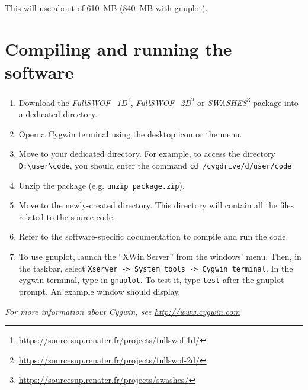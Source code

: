 \documentclass[a4paper, 11pt]{article}
\newcommand{\FullSWOFoneD}{\emph{FullSWOF\_1D}}
\newcommand{\FullSWOFtwoD}{\emph{FullSWOF\_2D}}
\newcommand{\SWASHES}{\emph{SWASHES}}
\newcommand{\MainWebSiteFSoneD}{https://sourcesup.renater.fr/projects/fullswof-1d/}
\newcommand{\MainWebSiteFStwoD}{https://sourcesup.renater.fr/projects/fullswof-2d/}
\newcommand{\MainWebSiteSWASHES}{https://sourcesup.renater.fr/projects/swashes/}
\begin{document}
This will use about of 610~MB (840~MB with gnuplot).

\section{Compiling and running the software}

\begin{enumerate}
\item Download the \FullSWOFoneD\footnote{\url{\MainWebSiteFSoneD}}, \FullSWOFtwoD{}\footnote{\url{\MainWebSiteFStwoD}} or \SWASHES{}\footnote{\url{\MainWebSiteSWASHES}} package into a dedicated directory.
\item Open a Cygwin terminal using the desktop icon or the menu.
\item Move to your dedicated directory. For example, to access the directory \verb!D:\user\code!, you should enter the command \verb!cd /cygdrive/d/user/code!
\item Unzip the package (e.g. \verb!unzip package.zip!).
\item Move to the newly-created directory. This directory will contain all the files related to the source code.
\item Refer to the software-specific documentation to compile and run the code.
\item To use gnuplot, launch the ``XWin Server'' from the windows' menu. Then, in the taskbar, select \verb!Xserver -> System tools -> Cygwin terminal!. In the cygwin terminal, type in \verb!gnuplot!. To test it, type \verb!test! after the gnuplot prompt. An example window should display.

\end{enumerate}

\emph{For more information about Cygwin, see \url{http://www.cygwin.com}}
\end{document}
